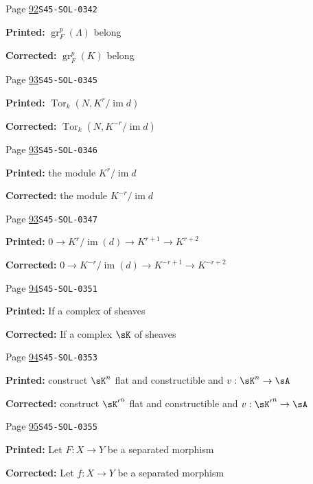 \documentclass[oneside]{book}
\DeclareMathOperator{\gr}{gr}
\DeclareMathOperator{\im}{im}
\DeclareMathOperator{\tor}{Tor}
\theoremstyle{sga-source}
\theoremstyle{sga-source-dash}
\theoremstyle{sga-source-dotdash}
\theoremstyle{sga-source-number-note-dash}
\theoremstyle{sga-source-note-number-dotdash}
\theoremstyle{sga-source-example-dotdash}
\theoremstyle{sga-source-inline-number}
\theoremstyle{sga-source-bare-number}
\theoremstyle{sga-source}
\begin{document}
\begin{description}
\smallskip
\item[\hypertarget{apparatus:EN-0029}{29}] Page \hyperlink{printpage:en:92}{92}\quad\texttt{S45-SOL-0342}
\par\noindent\textbf{Printed:} $\gr_F^p(\Lambda)$ belong
\par\noindent\textbf{Corrected:} $\gr_F^p(K)$ belong
\smallskip
\item[\hypertarget{apparatus:EN-0030}{30}] Page \hyperlink{printpage:en:93}{93}\quad\texttt{S45-SOL-0345}
\par\noindent\textbf{Printed:} \(\tor_k(N,K^r/\im d)\)
\par\noindent\textbf{Corrected:} \(\tor_k(N,K^{-r}/\im d)\)
\smallskip
\item[\hypertarget{apparatus:EN-0031}{31}] Page \hyperlink{printpage:en:93}{93}\quad\texttt{S45-SOL-0346}
\par\noindent\textbf{Printed:} the module $K^r/\im d$
\par\noindent\textbf{Corrected:} the module $K^{-r}/\im d$
\smallskip
\item[\hypertarget{apparatus:EN-0032}{32}] Page \hyperlink{printpage:en:93}{93}\quad\texttt{S45-SOL-0347}
\par\noindent\textbf{Printed:} \(0 \to K^r/\im(d) \to K^{r+1} \to K^{r+2}\)
\par\noindent\textbf{Corrected:} \(0 \to K^{-r}/\im(d) \to K^{-r+1} \to K^{-r+2}\)
\smallskip
\item[\hypertarget{apparatus:EN-0033}{33}] Page \hyperlink{printpage:en:94}{94}\quad\texttt{S45-SOL-0351}
\par\noindent\textbf{Printed:} If a complex of sheaves
\par\noindent\textbf{Corrected:} If a complex $\sK$ of sheaves
\smallskip
\item[\hypertarget{apparatus:EN-0034}{34}] Page \hyperlink{printpage:en:94}{94}\quad\texttt{S45-SOL-0353}
\par\noindent\textbf{Printed:} construct $\sK^n$ flat and constructible and $v:\sK^n\to \sA$
\par\noindent\textbf{Corrected:} construct ${\sK'}^n$ flat and constructible and $v:{\sK'}^n\to \sA$
\smallskip
\item[\hypertarget{apparatus:EN-0035}{35}] Page \hyperlink{printpage:en:95}{95}\quad\texttt{S45-SOL-0355}
\par\noindent\textbf{Printed:} Let $F:X\to Y$ be a separated morphism
\par\noindent\textbf{Corrected:} Let $f:X\to Y$ be a separated morphism

\end{description}
\end{document}
